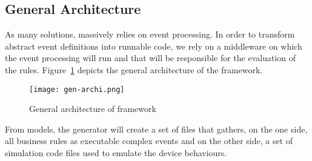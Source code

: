 \subsection{General Architecture}
\label{sec:CG-Architecture}

As many \IOT solutions, \IOTDSL massively relies on event processing. In order to transform abstract event definitions into runnable code, we rely on a middleware on which the event processing will run and that will be responsible for the evaluation of the rules. Figure~\ref{fig:gen-archi} depicts the general architecture of the \IOTDSL framework.

\begin{figure}%
	\centering  
	\texttt{[image: gen-archi.png]}%
	\caption{General architecture of \IOTDSL framework}%
	\label{fig:gen-archi}%
\end{figure}

From \IOTDSL models, the generator will create a set of files that gathers, on the one side, all business rules as executable complex events and on the other side, a set of simulation code files used to emulate the device behaviours.
